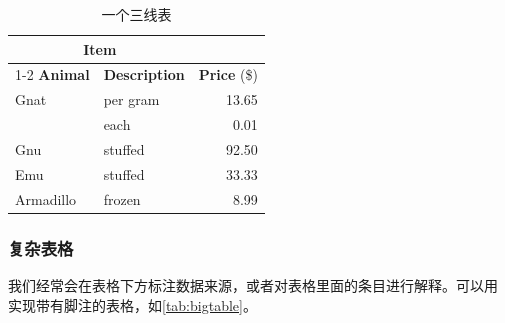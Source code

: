 \begin{table}[!hpt]
  \caption{一个三线表}
  \label{tab:firstone}
  \centering
  \begin{tabular}{@{}llr@{}} \toprule
    \multicolumn{2}{c}{\textbf{Item}}                            \\ \cmidrule(r){1-2}
    \textbf{Animal} & \textbf{Description} & \textbf{Price} (\$) \\ \midrule
    Gnat            & per gram             & 13.65               \\
                    & each                 & 0.01                \\
    Gnu             & stuffed              & 92.50               \\
    Emu             & stuffed              & 33.33               \\
    Armadillo       & frozen               & 8.99                \\ \bottomrule
  \end{tabular}
\end{table}

\subsubsection{复杂表格}

我们经常会在表格下方标注数据来源，或者对表格里面的条目进行解释。可以用  实现带有脚注的表格，如\cref{tab:bigtable}。

